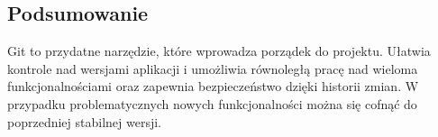 \subsection{Podsumowanie}
Git to przydatne narzędzie, które wprowadza porządek do projektu. Ułatwia kontrole nad wersjami aplikacji i umożliwia równoległą pracę nad wieloma funkcjonalnościami oraz zapewnia bezpieczeństwo dzięki historii zmian. W przypadku problematycznych nowych funkcjonalności można się cofnąć do poprzedniej stabilnej wersji.

